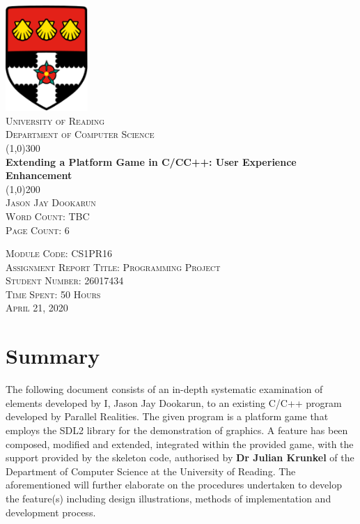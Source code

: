 \documentclass{article}
\begin{document}
\begin{titlepage}
    \begin{center}
        \includegraphics[height= 4cm ]{UoRlogo.png} \\
        [5mm]
        \textsc{\Large University of Reading} \\
        [0.5cm]
        \textsc{\Large Department of Computer Science} \\
        [1cm]

        \line(1,0){300}\\
        [0.25in]
        \huge{\bfseries Extending a Platform Game in C/CC++: User Experience Enhancement}\\
        [2mm]
        \line(1,0){200} \\
        [1cm]
        \textsc{\Large Jason Jay Dookarun} \\
        [2mm]
        \textsc{\large Word Count: TBC} \\
        [2mm]
        \textsc{\large Page Count: 6}\\
        [4cm]
        \end{center}
        \begin{flushright}
        \textsc{\normalsize Module Code: CS1PR16 \\
        Assignment Report Title: Programming Project \\
        Student Number: 26017434 \\
        Time Spent: 50 Hours \\
        April 21, 2020 } \\
        \end{flushright}
\end{titlepage}

\section*{Summary}

The following document consists of an in-depth systematic examination of elements developed by I, Jason Jay Dookarun, to an existing C/C++ program developed by Parallel Realities. The given program is a platform game that employs the SDL2 library for the demonstration of graphics. A feature has been composed, modified and extended, integrated within the provided game, with the support provided by the skeleton code, authorised by \textbf{Dr Julian Krunkel} of the Department of Computer Science at the University of Reading. The aforementioned will further elaborate on the procedures undertaken to develop the feature(s) including design illustrations, methods of implementation and development process.
\end{document}
